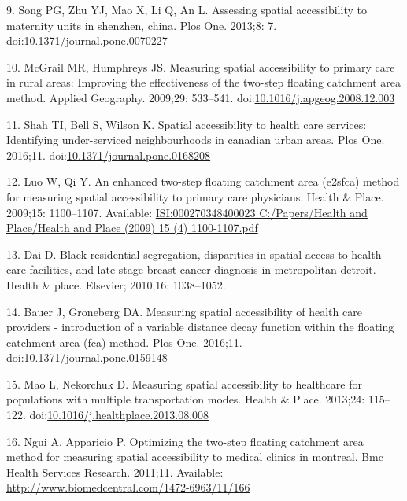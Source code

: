 \documentclass[10pt,letterpaper]{article}
\begin{document}
\hypertarget{ref-Song2013}{}
9. Song PG, Zhu YJ, Mao X, Li Q, An L. Assessing spatial accessibility
to maternity units in shenzhen, china. Plos One. 2013;8: 7.
doi:\href{https://doi.org/10.1371/journal.pone.0070227}{10.1371/journal.pone.0070227}

\hypertarget{ref-McGrail2009}{}
10. McGrail MR, Humphreys JS. Measuring spatial accessibility to primary
care in rural areas: Improving the effectiveness of the two-step
floating catchment area method. Applied Geography. 2009;29: 533--541.
doi:\href{https://doi.org/10.1016/j.apgeog.2008.12.003}{10.1016/j.apgeog.2008.12.003}

\hypertarget{ref-Shah2016}{}
11. Shah TI, Bell S, Wilson K. Spatial accessibility to health care
services: Identifying under-serviced neighbourhoods in canadian urban
areas. Plos One. 2016;11.
doi:\href{https://doi.org/10.1371/journal.pone.0168208}{10.1371/journal.pone.0168208}

\hypertarget{ref-Luo2009}{}
12. Luo W, Qi Y. An enhanced two-step floating catchment area (e2sfca)
method for measuring spatial accessibility to primary care physicians.
Health \& Place. 2009;15: 1100--1107. Available:
\href{ISI:000270348400023\%0AC:/Papers/Health\%20and\%20Place/Health\%20and\%20Place\%20(2009)\%2015\%20(4)\%201100-1107.pdf}{ISI:000270348400023
C:/Papers/Health and Place/Health and Place (2009) 15 (4) 1100-1107.pdf}

\hypertarget{ref-Dai2010}{}
13. Dai D. Black residential segregation, disparities in spatial access
to health care facilities, and late-stage breast cancer diagnosis in
metropolitan detroit. Health \& place. Elsevier; 2010;16: 1038--1052.

\hypertarget{ref-Bauer2016}{}
14. Bauer J, Groneberg DA. Measuring spatial accessibility of health
care providers - introduction of a variable distance decay function
within the floating catchment area (fca) method. Plos One. 2016;11.
doi:\href{https://doi.org/10.1371/journal.pone.0159148}{10.1371/journal.pone.0159148}

\hypertarget{ref-Mao2013}{}
15. Mao L, Nekorchuk D. Measuring spatial accessibility to healthcare
for populations with multiple transportation modes. Health \& Place.
2013;24: 115--122.
doi:\href{https://doi.org/10.1016/j.healthplace.2013.08.008}{10.1016/j.healthplace.2013.08.008}

\hypertarget{ref-Ngui2011}{}
16. Ngui A, Apparicio P. Optimizing the two-step floating catchment area
method for measuring spatial accessibility to medical clinics in
montreal. Bmc Health Services Research. 2011;11. Available:
\url{http://www.biomedcentral.com/1472-6963/11/166}
\end{document}
